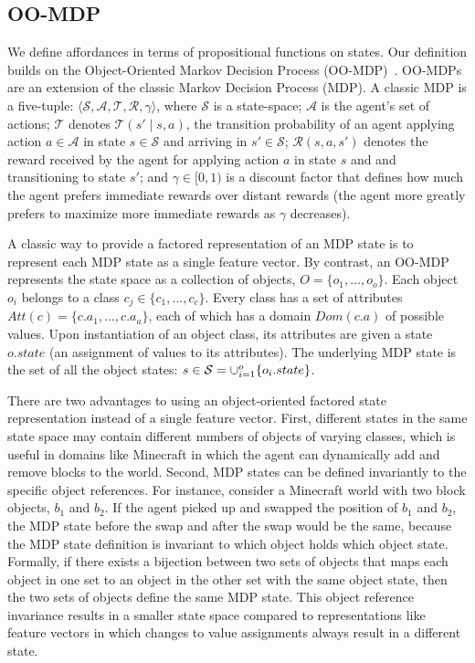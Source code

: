 \documentclass[]{article}
\begin{document}
\subsection{OO-MDP}

We define affordances in terms of propositional functions on states. Our definition builds on the Object-Oriented Markov Decision Process
(OO-MDP)~\citep{diuk08}.  OO-MDPs are an extension of
the classic Markov Decision Process (MDP).  A classic MDP is a
five-tuple: $\langle \mathcal{S}, \mathcal{A}, \mathcal{T},
\mathcal{R}, \gamma \rangle$, where $\mathcal{S}$ is a state-space;
$\mathcal{A}$ is the agent's set of actions; $\mathcal{T}$ denotes
$\mathcal{T}(s' \mid s,a)$, the transition probability of an agent
applying action $a \in \mathcal{A}$ in state $s \in \mathcal{S}$ and
arriving in $s' \in \mathcal{S}$; $\mathcal{R}(s,a,s')$ denotes the
reward received by the agent for applying action $a$ in state $s$ and
and transitioning to state $s'$; and $\gamma \in [0, 1)$ is a discount
  factor that defines how much the agent prefers immediate rewards
  over distant rewards (the agent more greatly prefers to maximize
  more immediate rewards as $\gamma$ decreases).

A classic way to provide a factored representation of an MDP state is to represent
each MDP state as a single feature vector. By contrast, an OO-MDP represents the state space as a collection of objects,
$O = \{o_1, \ldots, o_o \}$.  Each object $o_i$ belongs to a
class $c_j \in  \{c_1, \ldots, c_c\}$. Every class has a set of attributes
$Att(c) = \{c.a_1, \ldots, c.a_a \}$, each of which has a domain $Dom(c.a)$ of possible values.
Upon instantiation of an object class, its attributes are given a state $o.state$
(an assignment of values to its attributes).  The underlying MDP state is the set
of all the object states: $s \in {\cal S} = \cup_{i = 1}^o \{o_i.state\}$.

There are two advantages to using an object-oriented factored state
representation instead of a single feature vector. First, different
states in the same state space may contain different numbers of
objects of varying classes, which is useful in domains like Minecraft
in which the agent can dynamically add and remove blocks to the
world. Second, MDP states can be defined invariantly to the specific
object references.  For instance, consider a Minecraft world with two
block objects, $b_1$ and $b_2$.  If the agent picked up and swapped
the position of $b_1$ and $b_2$, the MDP state before the swap and
after the swap would be the same, because the MDP state definition is
invariant to which object holds which object state.  Formally, if
there exists a bijection between two sets of objects that maps each
object in one set to an object in the other set with the same object
state, then the two sets of objects define the same MDP state.  This
object reference invariance results in a smaller state space compared
to representations like feature vectors in which changes to value
assignments always result in a different state.
\end{document}

